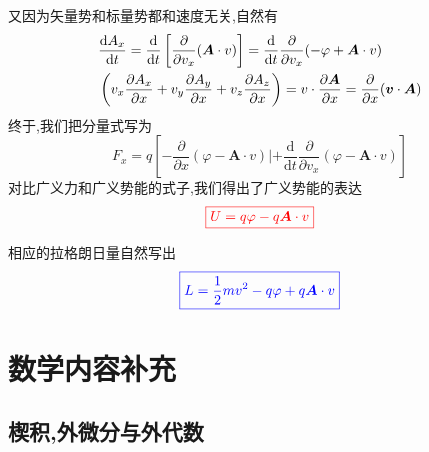 又因为矢量势和标量势都和速度无关,自然有
\begin{equation}
    \begin{aligned} &\frac{\mathrm{d} A_{x}}{\mathrm{d} t}=\frac{\mathrm{d}}{\mathrm{d} t}\left[\frac{\partial}{\partial v_{x}}(\boldsymbol{A} \cdot v)\right]=\frac{\mathrm{d}}{\mathrm{d} t} \frac{\partial}{\partial v_{x}}(-\varphi+\boldsymbol{A} \cdot v)\\ &\left(v_{x} \frac{\partial A_{x}}{\partial x}+v_{y} \frac{\partial A_{y}}{\partial x}+v_{z} \frac{\partial A_{z}}{\partial x}\right)=v \cdot \frac{\partial \boldsymbol{A}}{\partial x}=\frac{\partial}{\partial x}(\boldsymbol{v} \cdot \boldsymbol{A}) \end{aligned}\\
\end{equation}
终于,我们把分量式写为
\begin{equation}
    F_{x}=q\left[-\frac{\partial}{\partial x}(\varphi-\boldsymbol{A} \cdot v) |+\frac{\mathrm{d}}{\mathrm{d} t} \frac{\partial}{\partial v_{x}}(\varphi-\boldsymbol{A} \cdot v)\right]
\end{equation}
对比广义力和广义势能的式子,我们得出了广义势能的表达
\begin{equation}
    \color{red}{\boxed{U=q \varphi-q \boldsymbol{A} \cdot v} }
\end{equation}

相应的拉格朗日量自然写出
\begin{equation}
    \color{blue}{\boxed{L=\frac{1}{2} m v^{2}-q \varphi+q \boldsymbol{A} \cdot v }}
\end{equation}

\chapter{数学内容补充}
\section{楔积,外微分与外代数}
